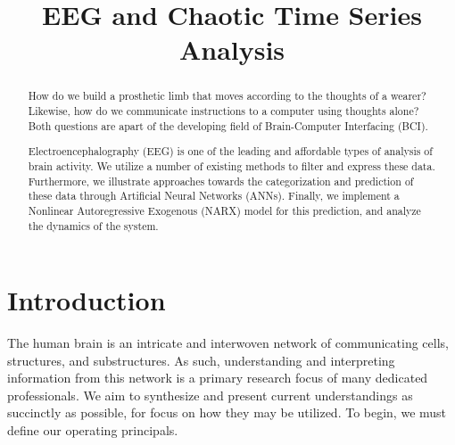\documentclass[twoside, 12pt]{article}
\date{} %
\theoremstyle{plain}
\begin{document}
\title{EEG and Chaotic Time Series Analysis}
\maketitle
\tableofcontents
\newpage
\begin{abstract}
How do we build a prosthetic limb that moves according to the thoughts of a wearer? Likewise, how do we communicate instructions to a computer using thoughts alone? Both questions are apart of the developing field of Brain-Computer Interfacing (BCI).

Electroencephalography (EEG) is one of the leading and affordable types of analysis of brain activity. We utilize a number of existing methods to filter and express these data. Furthermore, we illustrate approaches towards the categorization and prediction of these data through Artificial Neural Networks (ANNs). Finally, we implement a Nonlinear Autoregressive Exogenous (NARX) model for this prediction, and analyze the dynamics of the system.
\end{abstract}

\section{Introduction}
The human brain is an intricate and interwoven network of communicating cells, structures, and substructures. As such, understanding and interpreting information from this network is a primary research focus of many dedicated professionals. We aim to synthesize and present current understandings as succinctly as possible, for focus on how they may be utilized. To begin, we must define our operating principals.
\end{document}
